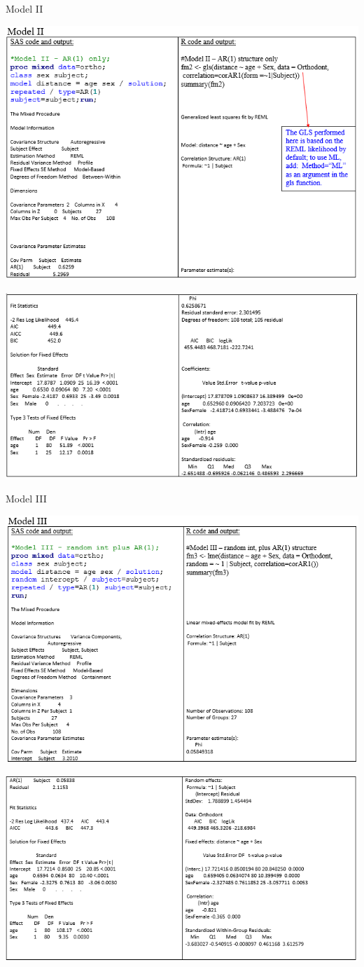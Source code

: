 \documentclass[
  9pt,
  ignorenonframetext,
]{beamer}
\begin{document}
\begin{frame}{Model II}
\protect\hypertarget{model-ii}{}
\begin{center}\includegraphics[width=0.7\linewidth]{figs_L9/f4} \end{center}

\begin{center}\includegraphics[width=0.7\linewidth]{figs_L9/f5} \end{center}
\end{frame}

\begin{frame}{Model III}
\protect\hypertarget{model-iii}{}
\begin{center}\includegraphics[width=0.7\linewidth]{figs_L9/f6} \end{center}

\begin{center}\includegraphics[width=0.7\linewidth]{figs_L9/f7} \end{center}
\end{frame}
\end{document}
